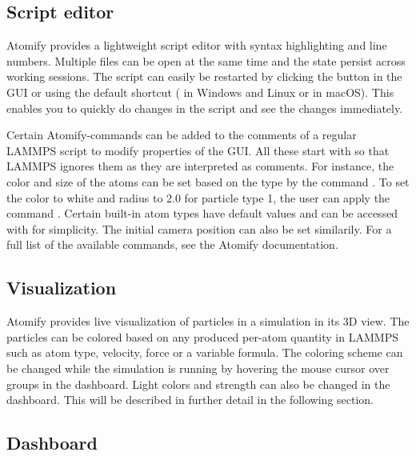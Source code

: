 \documentclass[aps,pre,twocolumn,letterpaper,floatfix,nofootinbib]{revtex4}
\begin{document}

\subsection{Script editor}

Atomify provides a lightweight script editor with syntax highlighting and line
numbers.
Multiple files can be open at the same time and the state persist across working sessions.
The script can easily be restarted by clicking the button in the GUI or using
the default shortcut ( in Windows and Linux or  in macOS).
This enables you to quickly do changes in the script and see the changes immediately. 

Certain Atomify-commands can be added to the comments of a regular LAMMPS script
to modify properties of the GUI.
All these start with \keys{\texttt{\#}} so that LAMMPS ignores them as they are
interpreted as comments.
For instance, the color and size of the atoms can be set based on the type by
the command .
To set the color to white and radius to 2.0 for particle type 1,
the user can apply the command .
Certain built-in atom types have default values and can be accessed with
 for simplicity.
The initial camera position can also be set similarily.
For a full list of the available commands, see the Atomify
documentation\cite{atomifydocumentation}.

\subsection{Visualization}

Atomify provides live visualization of particles in a simulation in its 3D view. 
The particles can be colored based on any produced per-atom quantity in LAMMPS such as
atom type, velocity, force or a variable formula.
The coloring scheme can be changed while the simulation is running by hovering
the mouse cursor over groups in the dashboard.
Light colors and strength can also be changed in the dashboard.
This will be described in further detail in the following section.

\subsection{Dashboard}
\end{document}

